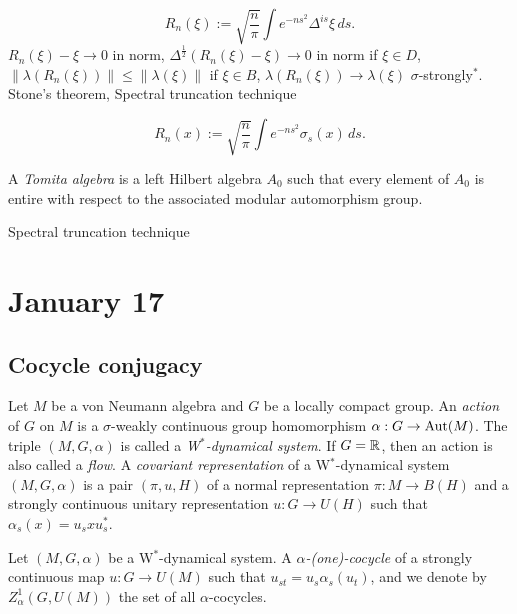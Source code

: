 \documentclass{../../small}
\begin{document}
\begin{cor}

\[R_n(\xi):=\sqrt{\frac n\pi}\int e^{-ns^2}\Delta^{is}\xi\,ds.\]
$R_n(\xi)-\xi\to0$ in norm, $\Delta^{\frac12}(R_n(\xi)-\xi)\to0$ in norm if $\xi\in D$, $\|\lambda(R_n(\xi))\|\le\|\lambda(\xi)\|$ if $\xi\in B$, $\lambda(R_n(\xi))\to\lambda(\xi)$ $\sigma$-strongly$^*$.
Stone's theorem,
Spectral truncation technique
\end{cor}


\begin{ex}

\[R_n(x):=\sqrt{\frac n\pi}\int e^{-ns^2}\sigma_s(x)\,ds.\]

A \emph{Tomita algebra} is a left Hilbert algebra $A_0$ such that every element of $A_0$ is entire with respect to the associated modular automorphism group.

Spectral truncation technique
\end{ex}








\newpage
\section{January 17}



\subsection{Cocycle conjugacy}

\begin{defn*}
Let $M$ be a von Neumann algebra and $G$ be a locally compact group.
An \emph{action} of $G$ on $M$ is a $\sigma$-weakly continuous group homomorphism $\alpha:G\to\operatorname{Aut}(M)$.
The triple $(M,G,\alpha)$ is called a \emph{W$^*$-dynamical system}.
If $G=\mathbb{R}$, then an action is also called a \emph{flow}.
A \emph{covariant representation} of a W$^*$-dynamical system $(M,G,\alpha)$ is a pair $(\pi,u,H)$ of a normal representation $\pi:M\to B(H)$ and a strongly continuous unitary representation $u:G\to U(H)$ such that $\alpha_s(x)=u_sxu_s^*$.
\end{defn*}



\begin{defn}
Let $(M,G,\alpha)$ be a W$^*$-dynamical system.
A \emph{$\alpha$-(one)-cocycle} of a strongly continuous map $u:G\to U(M)$ such that $u_{st}=u_s\alpha_s(u_t)$, and we denote by $Z_\alpha^1(G,U(M))$ the set of all $\alpha$-cocycles.
\end{defn}
\end{document}
